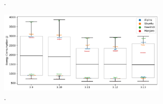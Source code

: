 \begin{figure}[t]
\begin{subfigure}[t]{0.49\textwidth}
    \caption{.}
    \label{fig:e_per_os}
\end{subfigure}
\hspace{\fill}
\begin{subfigure}{\textwidth}
    \centering
    \includegraphics[width=0.9\textwidth]{images/E_per_Python_version.pdf}
    \caption{.}
    \label{fig:e_per_os}
\end{subfigure}
\caption{}\label{fig:e_results}
\end{figure}





